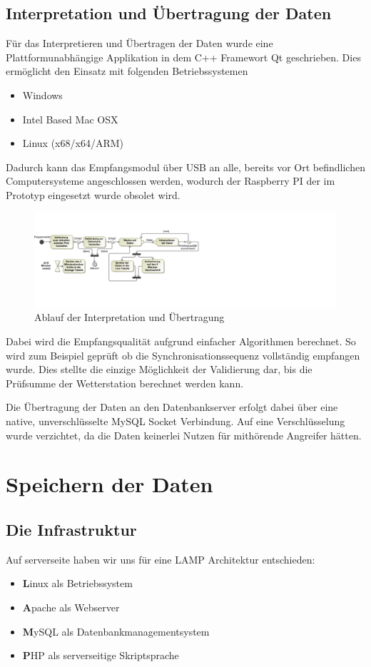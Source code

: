 \documentclass{report}
\begin{document}
\subsection{Interpretation und Übertragung der Daten}
Für das Interpretieren und Übertragen der Daten wurde eine Plattformunabhängige Applikation in dem C++ Framewort Qt\cite{QtProject} geschrieben. Dies ermöglicht den Einsatz mit folgenden Betriebssystemen
\begin{itemize}
    \item Windows
    \item Intel Based Mac OSX
    \item Linux (x68/x64/ARM)
\end{itemize}
Dadurch kann das Empfangsmodul über USB an alle, bereits vor Ort befindlichen Computersysteme angeschlossen werden, wodurch der Raspberry PI der im Prototyp eingesetzt wurde obsolet wird. 

\begin{figure}[!h]
\hspace{-10pt}
    \centerline{
        \includegraphics[width=14cm]{Bilder/InterpreterActivity.pdf}
    }
    \caption{Ablauf der Interpretation und Übertragung}
    \label{InterpreterActivity}
\end{figure}

Dabei wird die Empfangsqualität aufgrund einfacher Algorithmen berechnet. So wird zum Beispiel geprüft ob die Synchronisationssequenz vollständig empfangen wurde. Dies stellte die einzige Möglichkeit der Validierung dar, bis die Prüfsumme der Wetterstation berechnet werden kann.

Die Übertragung der Daten an den Datenbankserver erfolgt dabei über eine native, unverschlüsselte MySQL Socket Verbindung. Auf eine Verschlüsselung wurde verzichtet, da die Daten keinerlei Nutzen für mithörende Angreifer hätten. 

\section{Speichern der Daten}
\subsection{Die Infrastruktur}
Auf serverseite haben wir uns für eine LAMP Architektur entschieden:
\begin{itemize}
\item \textbf{L}inux als Betriebssystem
\item \textbf{A}pache als Webserver
\item \textbf{M}ySQL als Datenbankmanagementsystem
\item \textbf{P}HP als serverseitige Skriptsprache
\end{itemize}
\end{document}
